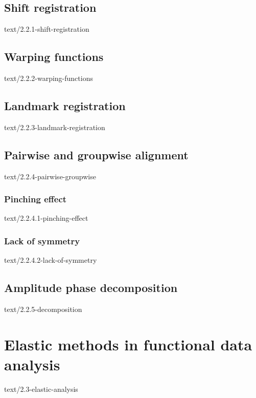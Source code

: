 \documentclass[epsbased,copyleft,final,printable,covers,extendedindex,firstnumbered,tfg, english]{tfgtfmthesisuam}
\begin{document}
    \subsection{Shift registration\label{SEC:SHIFT}}{text/2.2.1-shift-registration}
    \subsection{Warping functions\label{SEC:WARPING}}{text/2.2.2-warping-functions}
    \subsection{Landmark registration\label{SEC:LANDMARK}}{text/2.2.3-landmark-registration}
    \subsection{Pairwise and groupwise alignment\label{SEC:L2PAIRWISE}}{text/2.2.4-pairwise-groupwise}
      \subsubsection{Pinching effect\label{SSEC:PINCHING}}{text/2.2.4.1-pinching-effect}
      \subsubsection{Lack of symmetry\label{SSEC:SIMMETRY}}{text/2.2.4.2-lack-of-symmetry}
    \subsection{Amplitude phase decomposition\label{SEC:DECOMPOSITION}}{text/2.2.5-decomposition}

    \section{Elastic methods in functional data analysis\label{SEC:ELASTIC}}{text/2.3-elastic-analysis}
\end{document}
